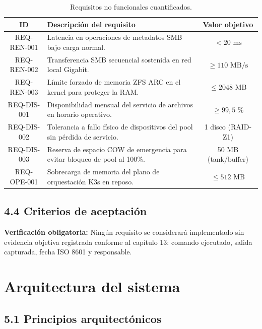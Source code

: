 \documentclass[10pt,a4paper]{article}
\begin{document}
\begin{table}[htbp]
\centering
\small
\caption{Requisitos no funcionales cuantificados.}
\label{tab:req_nofun}
\begin{tabular}{|c|p{10cm}|c|}
\hline
\textbf{\textsf{ID}} & \textbf{\textsf{Descripción del requisito}} & \textbf{\textsf{Valor objetivo}} \\
\hline
REQ-REN-001 & Latencia en operaciones de metadatos SMB bajo carga normal. & $< 20\text{ ms}$ \\
\hline
REQ-REN-002 & Transferencia SMB secuencial sostenida en red local Gigabit. & $\ge 110\text{ MB/s}$ \\
\hline
REQ-REN-003 & Límite forzado de memoria ZFS ARC en el kernel para proteger la RAM. & $\le 2048\text{ MB}$ \\
\hline
REQ-DIS-001 & Disponibilidad mensual del servicio de archivos en horario operativo. & $\ge 99,5\text{ \%}$ \\
\hline
REQ-DIS-002 & Tolerancia a fallo físico de dispositivos del pool sin pérdida de servicio. & 1 disco (RAID-Z1) \\
\hline
REQ-DIS-003 & Reserva de espacio COW de emergencia para evitar bloqueo de pool al 100\%. & 50 MB (tank/buffer) \\
\hline
REQ-OPE-001 & Sobrecarga de memoria del plano de orquestación K3s en reposo. & $\le 512\text{ MB}$ \\
\hline
\end{tabular}
\end{table}

\subsection{4.4 Criterios de aceptación}
\begin{normativabox}{}
\textbf{Verificación obligatoria:} Ningún requisito se considerará implementado sin evidencia objetiva registrada conforme al capítulo 13: comando ejecutado, salida capturada, fecha ISO 8601 y responsable.
\end{normativabox}

\newpage
\section{Arquitectura del sistema}

\subsection{5.1 Principios arquitectónicos}
\end{document}
